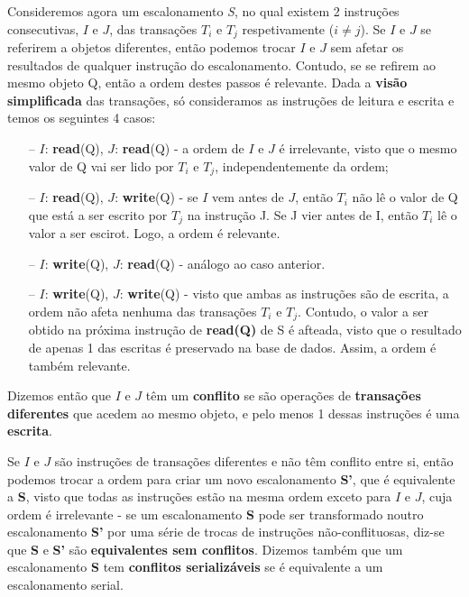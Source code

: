 \documentclass[oneside]{book}
\theoremstyle{definition}
\begin{document}
Consideremos agora um escalonamento \textit{S}, no qual existem 2 instruções consecutivas, $I$ e $J$, das transações $T_i$ e $T_j$ respetivamente ($i \neq j$). Se $I$ e $J$ se referirem a objetos diferentes, então podemos trocar $I$ e $J$ sem afetar os resultados de qualquer instrução do escalonamento. Contudo, se se refirem ao mesmo objeto Q, então a ordem destes passos é relevante. Dada a \textbf{visão simplificada} das transações, só consideramos as instruções de leitura e escrita e temos os seguintes 4 casos:
\begin{itemize}
    \itemsep 0cm
    \item[--] $I$: \textbf{read}(Q), $J$: \textbf{read}(Q) - a ordem de $I$ e $J$ é irrelevante, visto que o mesmo valor de Q vai ser lido por $T_i$ e $T_j$, independentemente da ordem;
    \item[--] $I$: \textbf{read}(Q), $J$: \textbf{write}(Q) - se $I$ vem antes de $J$, então $T_i$ não lê o valor de Q que está a ser escrito por $T_j$ na instrução J. Se J vier antes de I, então $T_i$ lê o valor a ser escirot. Logo, a ordem é relevante.
    \item[--] $I$: \textbf{write}(Q), $J$: \textbf{read}(Q) - análogo ao caso anterior.
    \item[--] $I$: \textbf{write}(Q), $J$: \textbf{write}(Q) - visto que ambas as instruções são de escrita, a ordem não afeta nenhuma das transações $T_i$ e $T_j$. Contudo, o valor a ser obtido na próxima instrução de \textbf{read(Q)} de S é afteada, visto que o resultado de apenas 1 das escritas é preservado na base de dados. Assim, a ordem é também relevante.
\end{itemize}

Dizemos então que $I$ e $J$ têm um \textbf{conflito} se são operações de \textbf{transações diferentes} que acedem ao mesmo objeto, e pelo menos 1 dessas instruções é uma \textbf{escrita}.

Se $I$ e $J$ são instruções de transações diferentes e não têm conflito entre si, então podemos trocar a ordem para criar um novo escalonamento \textbf{S'}, que é equivalente a \textbf{S}, visto que todas as instruções estão na mesma ordem exceto para $I$ e $J$, cuja ordem é irrelevante - se um escalonamento \textbf{S} pode ser transformado noutro escalonamento \textbf{S'} por uma série de trocas de instruções não-conflituosas, diz-se que \textbf{S} e \textbf{S'} são \textbf{equivalentes sem conflitos}.
Dizemos também que um escalonamento \textbf{S} tem \textbf{conflitos serializáveis} se é equivalente a um escalonamento serial.
\end{document}

